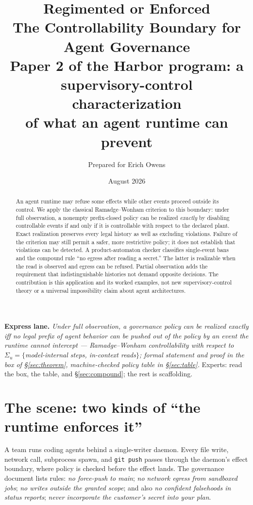\documentclass[11pt,a4paper]{article}  \usepackage{mdframed} \usepackage{graphicx} \usepackage{tabularx}
\title{\textbf{Regimented or Enforced}\\[4pt] \large The Controllability Boundary for Agent Governance\\[3pt] \normalsize
Paper 2 of the Harbor program: a supervisory-control characterization\\ of what an agent runtime can prevent}
\author{Prepared for Erich Owens} \date{August 2026}
\begin{document}
 \maketitle

\begin{abstract}
An agent runtime may refuse some effects while other events proceed outside
its control. We apply the classical Ramadge--Wonham criterion to this boundary:
under full observation, a nonempty prefix-closed policy can be realized
\emph{exactly} by disabling controllable events if and only if it is
controllable with respect to the declared plant. Exact realization preserves
every legal history as well as excluding violations. Failure of the criterion
may still permit a safer, more restrictive policy; it does not establish that
violations can be detected. A product-automaton checker classifies single-event
bans and the compound rule ``no egress after reading a secret.'' The latter is
realizable when the read is observed and egress can be refused. Partial
observation adds the requirement that indistinguishable histories not demand
opposite decisions. The contribution is this application and its worked
examples, not new supervisory-control theory or a universal impossibility
claim about agent architectures.
\end{abstract}

\vspace{0.5em} \noindent\textbf{Express lane.} \emph{Under full observation, a governance policy can be realized exactly iff no legal prefix of
agent behavior can be pushed out of the policy by an event the runtime cannot intercept --- Ramadge--Wonham controllability
with respect to $\Sigma_u = \{$model-internal steps, in-context reads$\}$; formal statement and proof in the box of
\S\ref{sec:theorem}, machine-checked policy table in \S\ref{sec:table}.} Experts: read the box, the table, and
\S\ref{sec:compound}; the rest is scaffolding.

\section{The scene: two kinds of ``the runtime enforces it''}\label{sec:scene} A team runs coding agents behind a
single-writer daemon. Every file write, network call, subprocess spawn, and \texttt{git push} passes through the daemon's
effect boundary, where policy is checked before the effect lands. The governance document lists rules: \emph{no force-push to
main}; \emph{no network egress from sandboxed jobs}; \emph{no writes outside the granted scope}; and also \emph{no confident
falsehoods in status reports}; \emph{never incorporate the customer's secret into your plan}.
\end{document}
